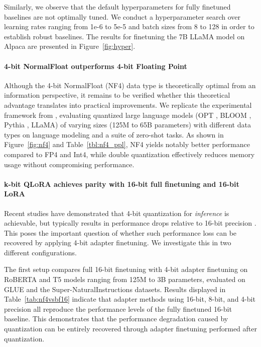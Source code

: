 Similarly, we observe that the default hyperparameters for fully finetuned baselines are not optimally tuned. We conduct a hyperparameter search over learning rates ranging from 1e-6 to 5e-5 and batch sizes from 8 to 128 in order to establish robust baselines. The results for finetuning the 7B LLaMA model on Alpaca are presented in Figure~\ref{fig:hyper}.

\paragraph{4-bit NormalFloat outperforms 4-bit Floating Point}

Although the 4-bit NormalFloat (NF4) data type is theoretically optimal from an information perspective, it remains to be verified whether this theoretical advantage translates into practical improvements. We replicate the experimental framework from \citet{dettmers2022case}, evaluating quantized large language models (OPT \citep{zhang2022opt}, BLOOM \cite{scao2022bloom}, Pythia \cite{biderman2023pythia}, LLaMA) of varying sizes (125M to 65B parameters) with different data types on language modeling and a suite of zero-shot tasks. As shown in Figure~\ref{fig:nf4} and Table~\ref{tbl:nf4_ppl}, NF4 yields notably better performance compared to FP4 and Int4, while double quantization effectively reduces memory usage without compromising performance.

\paragraph{k-bit \textsc{QLoRA} achieves parity with 16-bit full finetuning and 16-bit LoRA}

Recent studies have demonstrated that 4-bit quantization for \emph{inference} is achievable, but typically results in performance drops relative to 16-bit precision \citep{dettmers2022case,frantar2022gptq}. This poses the important question of whether such performance loss can be recovered by applying 4-bit adapter finetuning. We investigate this in two different configurations.

The first setup compares full 16-bit finetuning with 4-bit adapter finetuning on RoBERTA and T5 models ranging from 125M to 3B parameters, evaluated on GLUE and the Super-NaturalInstructions datasets. Results displayed in Table~\ref{tab:nf4vsbf16} indicate that adapter methods using 16-bit, 8-bit, and 4-bit precision all reproduce the performance levels of the fully finetuned 16-bit baseline. This demonstrates that the performance degradation caused by quantization can be entirely recovered through adapter finetuning performed after quantization.

